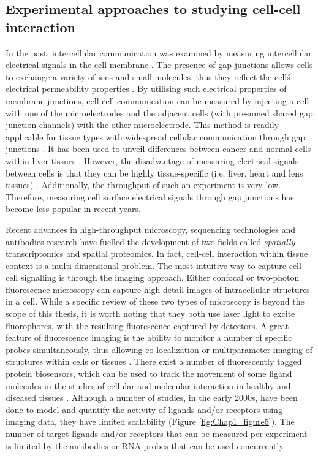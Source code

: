 \subsection{Experimental approaches to studying cell-cell interaction}
\label{Chap1:Sub_Spatial_Experiment_Platform}
In the past, intercellular communication was examined by measuring intercellular electrical signals in the cell membrane \cite{bennett1966physiology, loewenstein1967intercellular, de1982cell}. The presence of gap junctions allows cells to exchange a variety of ions and small molecules, thus they reflect the cell\'s electrical permeability properties \cite{penn1966ionic, bennett1966physiology,loewenstein1966permeability,loewenstein1974cellular}. By utilising such electrical properties of membrane junctions, cell-cell communication can be measured by injecting a cell with one of the microelectrodes and the adjacent cells (with presumed shared gap junction channels) with the other microelectrode. This method is readily applicable for tissue types with widespread cellular communication through gap junctions \cite{penn1966ionic}. It has been used to unveil differences between cancer and normal cells within liver tissues \cite{loewenstein1966intercellular, loewenstein1967intercellular}. However, the disadvantage of measuring electrical signals between cells is that they can be highly tissue-specific (i.e. liver, heart and lens tissues) \cite{gros1983comparative}. Additionally, the throughput of such an experiment is very low. Therefore, measuring cell surface electrical signals through gap junctions has become less popular in recent years. 

Recent advances in high-throughput microscopy, sequencing technologies and antibodies research have fuelled the development of two fields called \textit{spatially} transcriptomics and spatial proteomics. In fact, cell-cell interaction within tissue context is a multi-dimensional problem. The most intuitive way to capture cell-cell signalling is through the imaging approach. Either confocal or two-photon fluorescence microscopy can capture high-detail images of intracellular structures in a cell. While a specific review of these two types of microscopy is beyond the scope of this thesis, it is worth noting that they both use laser light to excite fluorophores, with the resulting fluorescence captured by detectors. A great feature of fluorescence imaging is the ability to monitor a number of specific probes simultaneously, thus allowing co-localization or multiparameter imaging of structures within cells or tissues \cite{periasamy2013methods}. There exist a number of fluorescently tagged protein biosensors, which can be used to track the movement of some ligand molecules in the studies of cellular and molecular interaction in healthy and diseased tissues \cite{gerdes2013cell}. Although a number of studies, in the early 2000s, have been done to model and quantify the activity of ligands and/or receptors \cite{awaji1998real, go1997quantitative, maamra1999studies, sneddon2003activation, bohme2009illuminating} using imaging data, they have limited scalability (Figure \ref{fig:Chap1_figure5}). The number of target ligands and/or receptors that can be measured per experiment is limited by the antibodies or RNA probes that can be used concurrently.    

